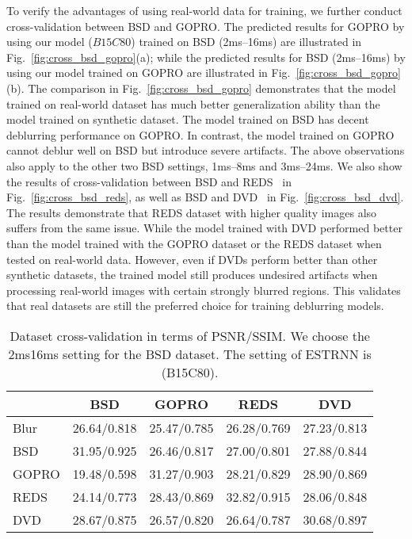 \documentclass[twocolumn]{svjour3}          \smartqed  \usepackage{graphicx}
\begin{document}
To verify the advantages of using real-world data for training, we further conduct cross-validation between BSD and GOPRO. The predicted results for GOPRO by using our model ($B15C80$) trained on BSD (2ms--16ms) are illustrated in Fig.~\ref{fig:cross_bsd_gopro}(a); while the predicted results for BSD (2ms--16ms) by using our model trained on GOPRO are illustrated in Fig.~\ref{fig:cross_bsd_gopro}(b). The comparison in Fig.~\ref{fig:cross_bsd_gopro} demonstrates that the model trained on real-world dataset has much better generalization ability than the model trained on synthetic dataset. The model trained on BSD has decent deblurring performance on GOPRO. In contrast, the model trained on GOPRO cannot deblur well on BSD but introduce severe artifacts. The above observations also apply to the other two BSD settings, 1ms--8ms and 3ms--24ms. We also show the results of cross-validation between BSD and REDS~\cite{nah2019ntire} in Fig.~\ref{fig:cross_bsd_reds}, as well as BSD and DVD~\cite{su2017deep} in Fig.~\ref{fig:cross_bsd_dvd}. The results demonstrate that REDS dataset with higher quality images also suffers from the same issue. While the model trained with DVD performed better than the model trained with the GOPRO dataset or the REDS dataset when tested on real-world data. However, even if DVDs perform better than other synthetic datasets, the trained model still produces undesired artifacts when processing real-world images with certain strongly blurred regions. This validates that real datasets are still the preferred choice for training deblurring models.

\begin{table*}[ht]
\caption{Dataset cross-validation in terms of PSNR/SSIM. We choose the 2ms16ms setting for the BSD dataset. The setting of ESTRNN is (B15C80).}
  \label{tab:cross}
  \setlength{\tabcolsep}{14pt}
  \centering
  \small
  \begin{tabular}{lcccc}
    \toprule
     & BSD & GOPRO & REDS & DVD\\
    \midrule
    Blur & 26.64/0.818 & 25.47/0.785 & 26.28/0.769 & 27.23/0.813\\
    \midrule
    BSD & 31.95/0.925 & 26.46/0.817 & 27.00/0.801 & 27.88/0.844 \\
    GOPRO & 19.48/0.598 & 31.27/0.903 & 28.21/0.829 & 28.90/0.869\\
    REDS & 24.14/0.773 & 28.43/0.869 & 32.82/0.915 & 28.06/0.848\\
    DVD & 28.67/0.875 & 26.57/0.820 & 26.64/0.787 & 30.68/0.897\\
    \bottomrule
  \end{tabular}
\end{table*}
\end{document}
